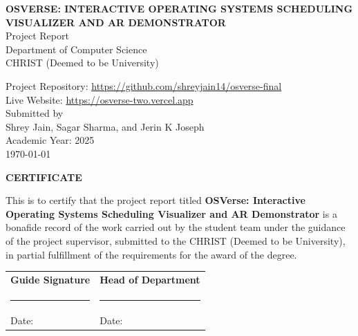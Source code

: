 \documentclass[12pt,a4paper,oneside]{report}
\newcommand{\projectTitle}{OSVerse: Interactive Operating Systems Scheduling Visualizer and AR Demonstrator}
\newcommand{\deptName}{Department of Computer Science}
\newcommand{\univName}{CHRIST (Deemed to be University)}
\newcommand{\githubURL}{https://github.com/shreyjain14/osverse-final}
\newcommand{\projectURL}{https://osverse-two.vercel.app}
\begin{document}
\begin{titlepage}
  \thispagestyle{nohf}
  \begin{center}
    {\bfseries\fontsize{16pt}{16pt}\selectfont \MakeUppercase{\projectTitle}\\[16pt]}
    \vspace{12pt}
    {\large Project Report}\\[12pt]
    \vspace{12pt}
    {\large \deptName}\\[6pt]
    {\large \univName}\\[24pt]

    \vfill

    {\large Project Repository: \href{\githubURL}{\githubURL}}\\[6pt]
    {\large Live Website: \href{\projectURL}{\projectURL}}\\[24pt]

    {\large Submitted by}\\[6pt]
    {\large Shrey Jain, Sagar Sharma, and Jerin K Joseph}\\[18pt]

    {\large Academic Year: 2025}\\[18pt]

    {\large \today}
  \end{center}
\end{titlepage}

\clearpage
\thispagestyle{nohf}
\begin{center}
  {\bfseries\fontsize{16pt}{16pt}\selectfont \MakeUppercase{Certificate}}\\[24pt]
\end{center}
\noindent This is to certify that the project report titled \textbf{\projectTitle} is a bonafide record of the work carried out by the student team under the guidance of the project supervisor, submitted to the \univName, in partial fulfillment of the requirements for the award of the degree.\\[18pt]

\vspace{36pt}
\begin{tabular}{p{}p{}}
\textbf{Guide Signature} & \textbf{Head of Department} \\
\rule{0.45\textwidth}{0.4pt} & \rule{0.45\textwidth}{0.4pt} \\
Date: & Date: \\
\end{tabular}
\end{document}
